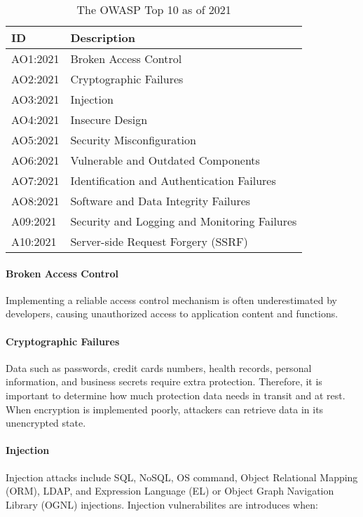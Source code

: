 \begin{table}
    \centering
    \caption{The OWASP Top 10 as of 2021}
    \label{tab:owasp-top-ten}
    \begin{tabulary}{1.0\textwidth}{|l|L|}
        \hline
        \textbf{ID} & \textbf{Description} \\
        \hline
        AO1:2021 & Broken Access Control \\
        \hline
        AO2:2021 & Cryptographic Failures \\
        \hline
        AO3:2021 & Injection \\
        \hline
        AO4:2021 & Insecure Design \\
        \hline
        AO5:2021 & Security Misconfiguration \\
        \hline
        AO6:2021 & Vulnerable and Outdated Components \\
        \hline
        AO7:2021 & Identification and Authentication Failures \\
        \hline
        AO8:2021 & Software and Data Integrity Failures \\
        \hline
        A09:2021 & Security and Logging and Monitoring Failures \\
        \hline
        A10:2021 & Server-side Request Forgery (SSRF) \\
        \hline 
    \end{tabulary}
\end{table}

\paragraph{Broken Access Control}
Implementing a reliable access control mechanism is often underestimated by developers, causing unauthorized access to application content and functions.

\paragraph{Cryptographic Failures}
Data such as passwords, credit cards numbers, health records, personal information, and business secrets require extra protection. Therefore, it is important to determine how much protection data needs in transit and at rest. When encryption is implemented poorly, attackers can retrieve data in its unencrypted state.

\paragraph{Injection}
Injection attacks include SQL, NoSQL, OS command, Object Relational Mapping (ORM), LDAP, and Expression Language (EL) or Object Graph Navigation Library (OGNL) injections. Injection vulnerabilites are introduces when:

